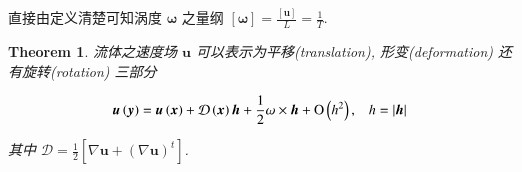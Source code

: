 \documentclass[11pt]{article}
\newtheorem{theorem}{Theorem}[subsection]
\begin{document}
直接由定义清楚可知涡度 $ \boldsymbol{\omega} $ 之量纲 $\left[ \boldsymbol{\omega}  \right] = \frac{{\left[ \boldsymbol{u} \right]}}{L} = \frac{1}{T}$.

\begin{theorem}
	流体之速度场 $ \boldsymbol{u} $ 可以表示为平移(translation), 形变(deformation) 还有旋转(rotation) 三部分
	
	\begin{equation}
	\boldsymbol{u}\left( \boldsymbol{y} \right) = \boldsymbol{u}\left( \boldsymbol{x} \right) + \mathcal{D}\left( \boldsymbol{x} \right)\boldsymbol{h} + \frac{1}{2}\omega  \times \boldsymbol{h} + {\rm O}\left( {h{}^2} \right),\;\;\;h = \left| \boldsymbol{h} \right|
	\label{eq5.3.2}
	\end{equation}
	
	其中 $\mathcal{D} = \frac{1}{2}\left[ {\nabla \boldsymbol{u} + {{\left( {\nabla \boldsymbol{u}} \right)}^t}} \right]$.
	\label{thm5.3.1}
\end{theorem}
\end{document}
